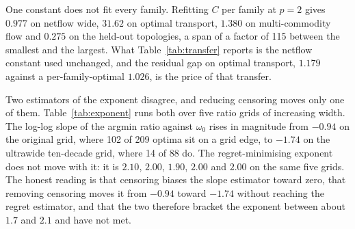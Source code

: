 One constant does not fit every family. Refitting $C$ per family at $p = 2$
gives $0.977$ on netflow wide, $31.62$ on optimal transport, $1.380$ on
multi-commodity flow and $0.275$ on the held-out topologies, a span of a factor
of 115 between the smallest and the largest. What Table~\ref{tab:transfer}
reports is the netflow constant used unchanged, and the residual gap on
optimal transport, $1.179$ against a per-family-optimal $1.026$, is the price
of that transfer.

Two estimators of the exponent disagree, and reducing censoring moves only one
of them. Table~\ref{tab:exponent} runs both over five ratio grids of increasing
width. The log-log slope of the argmin ratio against $\omega_0$ rises in
magnitude from $-0.94$ on the original grid, where 102 of 209 optima sit on a
grid edge, to $-1.74$ on the ultrawide ten-decade grid, where 14 of 88 do. The
regret-minimising exponent does not move with it: it is $2.10$, $2.00$, $1.90$,
$2.00$ and $2.00$ on the same five grids. The honest reading is that censoring
biases the slope estimator toward zero, that removing censoring moves it from
$-0.94$ toward $-1.74$ without reaching the regret estimator, and that the two
therefore bracket the exponent between about $1.7$ and $2.1$ and have not met.

